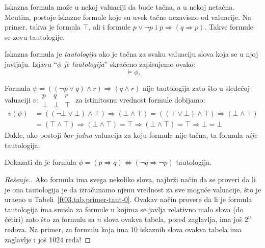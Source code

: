 Iskazna formula mo\v ze u nekoj valuaciji da bude ta\v cna, a u nekoj neta\v cna. Me\dj utim,
postoje iskazne formule koje su uvek ta\v cne nezavisno od valuacije.
Na primer, takva je formula $\top$, ali i formule $p \lor \lnot p$ i $p \Rightarrow (q \Rightarrow p)$.
Takve formule se zovu tautologije.

\begin{DEF}
  Iskazna formula je \emph{tautologija} ako je ta\v cna za svaku valuaciju slova koja se u njoj javljaju.
  Izjavu \enquote{\textit{$\phi$ je tautologija}} skra\'ceno zapisujemo ovako:
  $$
    \vDash \phi.
  $$
\end{DEF}

\begin{EX}
  Formula $\psi = ((\lnot p \lor q) \land r) \Rightarrow (q \land r)$ nije tautologija zato \v sto
  u slede\'coj valuaciji
  $
    v : \begin{array}{ccc}
    p & q & r \\
    \hline
    \bot & \bot & \top
    \end{array}
  $
  za istinitosnu vrednost formule dobijamo:
  \begin{align*}
    v(\psi) &= ((\lnot \bot \lor \bot) \land \top) \Rightarrow (\bot \land \top) = ((\top \lor \bot) \land \top) \Rightarrow (\bot \land \top) \\
    &= (\top \land \top) \Rightarrow (\bot \land \top) = \top \Rightarrow (\bot \land \top) = \top \Rightarrow \bot = \bot
  \end{align*}
  Dakle, ako postoji \emph{bar jedna} valuacija za koju formula nije ta\v cna, ta formula \emph{nije} tautologija.
\end{EX}

\begin{EX}
  Dokazati da je formula $\phi = (p \Rightarrow q) \Leftrightarrow (\lnot q \Rightarrow \lnot p)$ tautologija.
\end{EX}
\begin{proof}[Re\v senje.]
  Ako formula ima svega nekoliko slova, najbr\v zi na\v cin da se proveri da li je ona tautologija je
  da izra\v cunamo njenu vrednost za sve mogu\'ce valuacije, \v sto je ura\dj eno u Tabeli~\ref{ft03.tab.primer-taut-0}.
  Ovakav na\v cin provere da li je formula tautologija ima smisla za formule u kojima se javlja relativno malo slova (do \v cetiri)
  zato \v sto za formulu sa $n$ slova ovakva tabela, pored zaglavlja, ima jo\v s $2^n$ redova.
  Na primer, za formulu koja ima 10 iskaznih slova ovakva tabela ima zaglavlje i jo\v s 1024 reda!
\end{proof}

